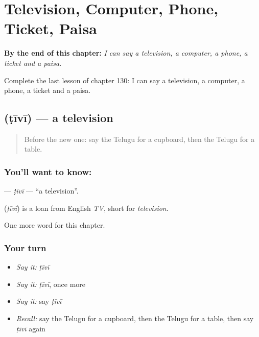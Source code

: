 
\chapter{Television, Computer, Phone, Ticket, Paisa}
\label{ch:te-television-computer-phone-ticket-paisa}

\begin{chapteropening}
\textbf{By the end of this chapter:} \emph{I can say a television, a computer, a phone, a ticket and a paisa.}

Complete the last lesson of chapter 130: I can say a television, a computer, a phone, a ticket and a paisa.
\end{chapteropening}

\section[\texorpdfstring{\te{టీవీ} (ṭīvī)}{టీవీ (ṭīvī)}]{ (ṭīvī) — a television}

\label{lesson:TE-C130-tivi}



\begin{quote}
Before the new one: say the Telugu for a cupboard, then the Telugu for a table.
\end{quote}

\subsection*{You'll want to know: }
\textbf{} — \emph{ṭīvī} — \textquotedblleft{}a television\textquotedblright{}.

\begin{cousinweb}
\textbf{} (\emph{ṭīvī}) is a loan from English \emph{TV}, short for \emph{television}.
\end{cousinweb}

\begin{grammarlens}[title={What you've built}]
One more word for this chapter.
\end{grammarlens}

\subsection*{Your turn}
\begin{itemize}
\raggedright
  \item \emph{Say it:} \emph{ṭīvī}
  \item \emph{Say it:} \emph{ṭīvī}, once more
  \item \emph{Say it:} say \emph{ṭīvī}
  \item \emph{Recall:} say the Telugu for a cupboard, then the Telugu for a table, then say \emph{ṭīvī} again
\end{itemize}

